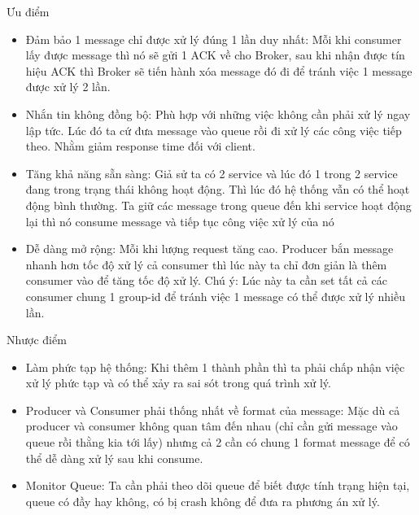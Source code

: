 \begin{itemize}
\begin{itemize}
            \end{itemize}
            
            Ưu điểm
            
            \begin{itemize}
                \item Đảm bảo 1 message chỉ được xử lý đúng 1 lần duy nhất: Mỗi khi consumer lấy được message thì nó sẽ gửi 1 ACK về cho Broker, sau khi nhận được tín hiệu ACK thì Broker sẽ tiến hành xóa message đó đi để tránh việc 1 message được xử lý 2 lần.
                \item Nhắn tin không đồng bộ: Phù hợp với những việc không cần phải xử lý ngay lập tức. Lúc đó ta cứ đưa message vào queue rồi đi xử lý các công việc tiếp theo. Nhằm giảm response time đối với client.
                \item Tăng khả năng sẵn sàng: Giả sử ta có 2 service và lúc đó 1 trong 2 service đang trong trạng thái không hoạt động. Thì lúc đó hệ thống vẫn có thể hoạt động bình thường. Ta giữ các message trong queue đến khi service hoạt động lại thì nó consume message và tiếp tục công việc xử lý của nó
                \item Dễ dàng mở rộng: Mỗi khi lượng request tăng cao. Producer bắn message nhanh hơn tốc độ xử lý cả consumer thì lúc này ta chỉ đơn giản là thêm consumer vào để tăng tốc độ xử lý. Chú ý: Lúc này ta cần set tất cả các consumer chung 1 group-id để tránh việc 1 message có thể được xử lý nhiều lần.
            \end{itemize}
            
            Nhược điểm
            
            \begin{itemize}
                \item Làm phức tạp hệ thống: Khi thêm 1 thành phần thì ta phải chấp nhận việc xử lý phức tạp và có thể xảy ra sai sót trong quá trình xử lý.
                \item Producer và Consumer phải thống nhất về format của message: Mặc dù cả producer và consumer không quan tâm đến nhau (chỉ cần gửi message vào queue rồi thằng kia tới lấy) nhưng cả 2 cần có chung 1 format message để có thể dễ dàng xử lý sau khi consume.
                \item Monitor Queue: Ta cần phải theo dõi queue để biết được tính trạng hiện tại, queue có đầy hay không, có bị crash không để đưa ra phương án xử lý.
            \end{itemize}
            

\end{itemize}
